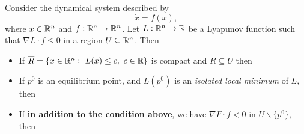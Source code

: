 \begin{propbox}
	Consider the dynamical system described by
	\[ \dot{x} = f(x), \]
	where $x\in\mathbb{R}^n$ and $f:\mathbb{R}^n \to \mathbb{R}^n$. Let $L:\mathbb{R}^n\to\mathbb{R}$ be a Lyapunov function such that $\nabla L \cdot f \leq 0$ in a region $U \subseteq \mathbb{R}^n$. Then
	\begin{itemize}
		\item If $\overline{R}=\{x\in\mathbb{R}^n:\ L(x)\leq c,\ c\in\mathbb{R}\}$ is compact and $\overline{R}\subseteq U $ then 
		\begin{center}
		\end{center}
		\item If $p^0$ is an equilibrium point, and $L(p^0)$ is an \emph{isolated local minimum} of $L$, then
		\begin{center}
		\end{center}
		\item If \textbf{in addition to the condition above}, we have $\nabla F \cdot f < 0$ in $U\backslash\{p^0\}$, then 
		\begin{center}
		\end{center}
	\end{itemize}
\end{propbox}

